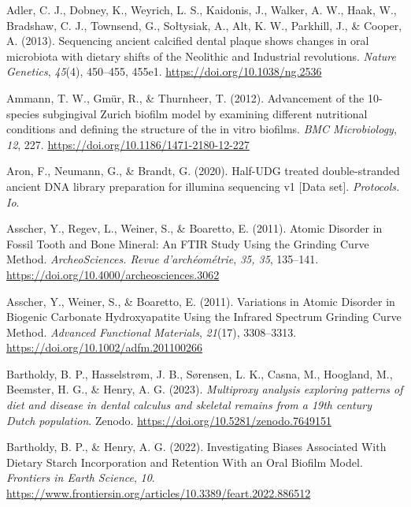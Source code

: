 \documentclass[
]{article}
\newlength{\cslhangindent}
\newlength{\cslentryspacingunit} %
\newenvironment{CSLReferences}[2] %
 {%
  \setlength{\parindent}{0pt}
  \ifodd #1
  \let\oldpar\par
  \def\par{\hangindent=\cslhangindent\oldpar}
  \fi
  \setlength{\parskip}{#2\cslentryspacingunit}
 }%
 {}
\begin{document}
\hypertarget{refs}{}
\begin{CSLReferences}{1}{0}
\leavevmode{}%
Adler, C. J., Dobney, K., Weyrich, L. S., Kaidonis, J., Walker, A. W.,
Haak, W., Bradshaw, C. J., Townsend, G., Sołtysiak, A., Alt, K. W.,
Parkhill, J., \& Cooper, A. (2013). Sequencing ancient calcified dental
plaque shows changes in oral microbiota with dietary shifts of the
{Neolithic} and {Industrial} revolutions. \emph{Nature Genetics},
\emph{45}(4), 450--455, 455e1. \url{https://doi.org/10.1038/ng.2536}

\leavevmode{}%
Ammann, T. W., Gmür, R., \& Thurnheer, T. (2012). Advancement of the
10-species subgingival {Zurich} biofilm model by examining different
nutritional conditions and defining the structure of the in vitro
biofilms. \emph{BMC Microbiology}, \emph{12}, 227.
\url{https://doi.org/10.1186/1471-2180-12-227}

\leavevmode{}%
Aron, F., Neumann, G., \& Brandt, G. (2020). Half-{UDG} treated
double-stranded ancient {DNA} library preparation for illumina
sequencing v1 {[}{Data} set{]}. \emph{Protocols. Io}.

\leavevmode{}%
Asscher, Y., Regev, L., Weiner, S., \& Boaretto, E. (2011). Atomic
{Disorder} in {Fossil Tooth} and {Bone Mineral}: {An FTIR Study Using}
the {Grinding Curve Method}. \emph{ArcheoSciences. Revue
d'archéométrie}, \emph{35, 35}, 135--141.
\url{https://doi.org/10.4000/archeosciences.3062}

\leavevmode{}%
Asscher, Y., Weiner, S., \& Boaretto, E. (2011). Variations in {Atomic
Disorder} in {Biogenic Carbonate Hydroxyapatite Using} the {Infrared
Spectrum Grinding Curve Method}. \emph{Advanced Functional Materials},
\emph{21}(17), 3308--3313. \url{https://doi.org/10.1002/adfm.201100266}

\leavevmode{}%
Bartholdy, B. P., Hasselstrøm, J. B., Sørensen, L. K., Casna, M.,
Hoogland, M., Beemster, H. G., \& Henry, A. G. (2023). \emph{Multiproxy
analysis exploring patterns of diet and disease in dental calculus and
skeletal remains from a 19th century {Dutch} population}. {Zenodo}.
\url{https://doi.org/10.5281/zenodo.7649151}

\leavevmode{}%
Bartholdy, B. P., \& Henry, A. G. (2022). Investigating {Biases
Associated With Dietary Starch Incorporation} and {Retention With} an
{Oral Biofilm Model}. \emph{Frontiers in Earth Science}, \emph{10}.
\url{https://www.frontiersin.org/articles/10.3389/feart.2022.886512}


\end{CSLReferences}
\end{document}
